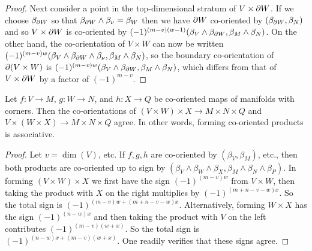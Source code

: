 \begin{proof}
	Next consider a point in the top-dimensional stratum of $V \times \partial W$.
	If we choose $\beta_{\partial W}$ so that $\beta_{\partial W} \wedge \beta_\nu = \beta_W$ then we have $\partial W$ co-oriented by $(\beta_{\partial W},\beta_N)$ and so $V \times \partial W$ is co-oriented by $(-1)^{(m-v)(w-1)}(\beta_{V} \wedge \beta_{\partial W},\beta_M \wedge \beta_N)$.
	On the other hand, the co-orientation of $V \times W$ can now be written $(-1)^{(m-v)w}(\beta_{V} \wedge \beta_{\partial W} \wedge \beta_\nu,\beta_M \wedge \beta_N)$, so the boundary co-orientation of $\partial(V \times W)$ is $(-1)^{(m-v)w}(\beta_{V} \wedge \beta_{\partial W},\beta_{M} \wedge \beta_N)$, which differs from that of $V \times \partial W$ by a factor of $(-1)^{m-v}$.
\end{proof}

\begin{proposition}\label{P: exterior associativity}
	Let $f \colon V \to M$, $g \colon W \to N$, and $h \colon X \to Q$ be co-oriented maps of manifolds with corners.
	Then the co-orientations of $(V \times W) \times X \to M \times N \times Q$ and $V \times (W \times X) \to M \times N \times Q$ agree.
	In other words, forming co-oriented products is associative.
\end{proposition}

\begin{proof}
	Let $v = \dim(V)$, etc.
	If $f,g,h$ are co-oriented by $(\beta_V,\beta_M)$, etc., then both products are co-oriented up to sign by $(\beta_V \wedge \beta_W \wedge \beta_X,\beta_M \wedge \beta_N \wedge \beta_P)$.
	In forming $(V \times W) \times X$ we first have the sign $(-1)^{(m-v)w}$ from $V \times W$, then taking the product with $X$ on the right multiplies by $(-1)^{(m+n-v-w)x}$.
	So the total sign is $(-1)^{(m-v)w+(m+n-v-w)x}$.
	Alternatively, forming $W \times X$ has the sign $(-1)^{(n-w)x}$ and then taking the product with $V$ on the left contributes $(-1)^{(m-v)(w+x)}$.
	So the total sign is $(-1)^{(n-w)x+(m-v)(w+x)}$.
	One readily verifies that these signs agree.
\end{proof}


